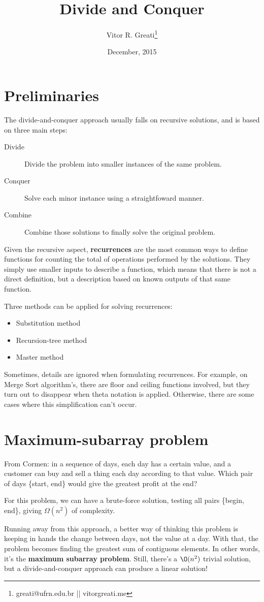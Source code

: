\documentclass{article}
\begin{document}
\title{Divide and Conquer}
\author{Vitor R. Greati\thanks{greati@ufrn.edu.br || vitorgreati.me}}
\date{December, 2015}

\maketitle

\section{Preliminaries}

The divide-and-conquer approach usually falls on recursive solutions, and is based on three main
steps:
\begin{description}
	\item[Divide] Divide the problem into smaller instances of the same problem.
	\item[Conquer] Solve each minor instance using a straightfoward manner.
	\item[Combine] Combine those solutions to finally solve the original problem.
\end{description}

Given the recursive aspect, \textbf{recurrences} are the most common ways to define functions for
counting the total of operations performed by the solutions. They simply use smaller inputs to describe
a function, which means that there is not a direct definition, but a description based on known outputs
of that same function.

Three methods can be applied for solving recurrences:
\begin{itemize}
	\item{Substitution method}
	\item{Recursion-tree method}
	\item{Master method}
\end{itemize}

Sometimes, details are ignored when formulating recurrences. For example, on Merge Sort algorithm's,
there are floor and ceiling functions involved, but they turn out to disappear when theta notation
is applied. Otherwise, there are some cases where this simplification can't occur.

\section{Maximum-subarray problem}
From Cormen: in a sequence of days, each day has a certain value, and a customer can buy and sell
a thing each day according to that value. Which pair of days \{start, end\} would give the greatest profit at
the end?

For this problem, we can have a brute-force solution, testing all pairs \{begin, end\},
giving $\Omega(n^2)$ of complexity.

Running away from this approach, a better way of thinking this problem is keeping in hands the change
between days, not the value at a day. With that, the problem becomes finding the greatest sum of
contiguous elements. In other words, it's the \textbf{maximum subarray problem}. Still, there's a $\O(n^2)$ trivial solution,
but a divide-and-conquer approach can produce a linear solution!
\end{document}
